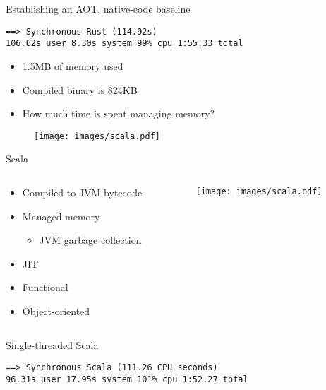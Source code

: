 \documentclass[aspectratio=169]{beamer}
\begin{document}
\begin{frame}[fragile]{Establishing an AOT, native-code baseline}
  \begin{verbatim}
==> Synchronous Rust (114.92s)
106.62s user 8.30s system 99% cpu 1:55.33 total
    \end{verbatim}

    \begin{itemize}
      \item 1.5MB of memory used
      \item Compiled binary is 824KB
      \item How much time is spent managing memory?
    \end{itemize}
\end{frame}


\begin{frame}
  \begin{figure}
    \texttt{[image: images/scala.pdf]}
  \end{figure}
\end{frame}


\begin{frame}{Scala}
  \begin{columns}[c]
    \begin{column}{0.6\textwidth}
      \begin{itemize}
      \item Compiled to JVM bytecode
      \item Managed memory
        \begin{itemize}
          \item JVM garbage collection
        \end{itemize}
      \item JIT
      \item Functional
      \item Object-oriented
      \end{itemize}
    \end{column}

    \begin{column}{0.4\textwidth}
      \begin{figure}
        \texttt{[image: images/scala.pdf]}
      \end{figure}
    \end{column}
  \end{columns}
\end{frame}


\begin{frame}[fragile]{Single-threaded Scala}
  \begin{verbatim}
==> Synchronous Scala (111.26 CPU seconds)
96.31s user 17.95s system 101% cpu 1:52.27 total
  \end{verbatim}
\end{frame}
\end{document}
